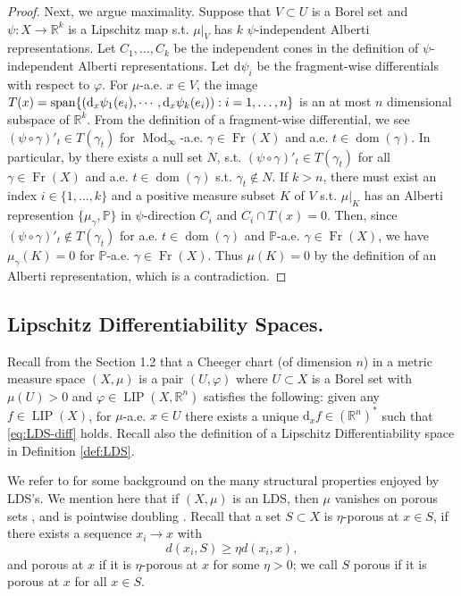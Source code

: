 \documentclass{amsart}
\numberwithin{equation}{section}
\newcommand{\R}{\mathbb{R}}
\newcommand{\Mod}{\operatorname{Mod}}
\newcommand{\LIP}{\operatorname{LIP}}
\newcommand{\dom}{\operatorname{dom}}
\newcommand{\Fr}{\operatorname{Fr}}
\newcommand{\ud}{\mathrm {d}}
\begin{document}
\begin{proof}
    Next, we argue maximality. Suppose that $V\subset U$ is a Borel set and $\psi:X\to \R^k$ is a Lipschitz map s.t. $\mu|_V$ has $k$ $\psi$-independent Alberti representations. Let $C_1,\dots, C_k$ be the independent cones in the definition of $\psi$-independent Alberti representations. Let $\ud \psi_i$  be the fragment-wise differentials with respect to $\varphi$. For $\mu$-a.e. $x\in V$, the image $T(x)={\rm span}\{(\ud_x \psi_1(e_i), \cdots, \ud_x \psi_k(e_i)) : i=1,\dots, n\}$ is an at most $n$ dimensional subspace of $\R^k$. From the definition of a fragment-wise differential, we see $(\psi \circ \gamma)'_t\in T(\gamma_t)$ for $\Mod_\infty$-a.e. $\gamma\in \Fr(X)$ and a.e. $t\in \dom(\gamma)$. In particular, by \cite[Lemma 2.7]{tsd24} there exists a null set $N$, s.t. $(\psi \circ \gamma)'_t\in T(\gamma_t)$ for all $\gamma\in \Fr(X)$ and a.e. $t\in \dom(\gamma)$ s.t. $\gamma_t\not\in N$.  If $k>n$, there must exist an index $i\in \{1,\dots, k\}$ and a positive measure subset $K$ of $V$ s.t. $\mu|_K$ has an Alberti represention $\{\mu_\gamma,\mathbb{P}\}$ in $\psi$-direction $C_i$ and $C_i\cap T(x)=0$. Then, since $(\psi\circ \gamma)'_t\not\in T(\gamma_t)$ for a.e. $t\in \dom(\gamma)$ and $\mathbb{P}$-a.e. $\gamma\in \Fr(X)$, we have $\mu_\gamma(K)=0$ for $\mathbb{P}$-a.e. $\gamma\in \Fr(X)$. Thus $\mu(K)=0$ by the definition of an Alberti representation, which is a contradiction.
\end{proof}


\subsection{Lipschitz Differentiability Spaces.} Recall from the Section 1.2 that a Cheeger chart (of dimension $n$) in a metric measure space $(X,\mu)$ is a pair $(U,\varphi)$ where $U\subset X$ is a Borel set with $\mu(U)>0$ and $\varphi\in\LIP(X,\R^n)$ satisfies the following: given any $f\in \LIP(X)$, for $\mu$-a.e. $x\in U$ there exists a unique $\ud_xf\in (\R^n)^*$ such that \eqref{eq:LDS-diff} holds. Recall also the definition of a Lipschitz Differentiability space in Definition \ref{def:LDS}.

We refer to \cite{sch16b,kei02,bate12diff,bate2013differentiability} for some background on the many structural properties enjoyed by LDS's. We mention here that if $(X,\mu)$ is an LDS, then $\mu$ vanishes on porous sets \cite[Theorem 2.4]{bate2013differentiability}, and is pointwise doubling  \cite[Corollary 2.6]{bate2013differentiability}. Recall that a set $S\subset X$ is $\eta$-porous at $x\in S$, if there exists a sequence $x_i\to x$ with $$d(x_i,S)\ge\eta d(x_i,x),$$ and porous at $x$ if it is $\eta$-porous at $x$ for some $\eta>0$; we call $S$ porous if it is porous at $x$ for all $x\in S$. 
\end{document}
